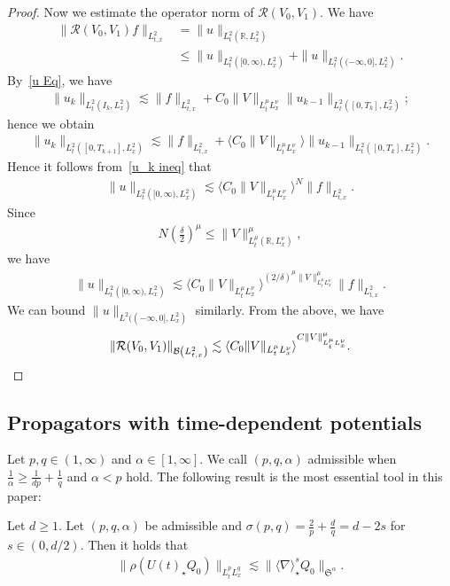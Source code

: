 \documentclass[AHL,Unicode,longabstracts,MathTools,published]{cedram}
\newcommand{\CB}{\mathcal{B}}
\newcommand{\CR}{\mathcal{R}}
\newcommand{\FS}{\mathfrak{S}}
\newcommand{\al}{\alpha}
\newcommand{\de}{\delta}
\newcommand{\si}{\sigma}
\newcommand{\rh}{\rho}
\newcommand{\K}[1]{\left(#1\right)}
\newcommand{\Br}[1]{\langle #1 \rangle}
\newcommand*\bra[1]{\langle#1\rangle}
\newcommand{\I}{\infty}
\newcommand{\sd}{\langle \nabla \rangle}
\newcommand{\st}{\star}
\newcommand{\R}{\mathbb{R}}
\newcommand{\ls}{\lesssim}
\begin{document}
\begin{proof}
Now we estimate the operator norm of $\CR(V_0, V_1)$. We have
\begin{align}
\|\CR(V_0,V_1)f\|_{L^2_{t,x}} &= \|u\|_{L^2_t\left(\R,L^2_x\right)} \\
&\leq \|u\|_{L^2_t\left([0,\I),L^2_x\right)} + \|u\|_{L^2_t\left((-\I,0],L^2_x\right)}.
\end{align}
By~\eqref{u Eq}, we have
\begin{align}\label{u_k ineq}
\|u_k\|_{L^2_t\left(I_k,L^2_x\right)}
\ls \|f\|_{L^2_{t,x}} + C_0\|V\|_{L^\mu_t L^\nu_x} \|u_{k-1}\|_{L^2_t\left([0,T_k],L^2_x\right)};
\end{align}
hence we obtain
\begin{align}
\|u_k\|_{L^2_t\left([0,T_{k+1}],L^2_x\right)}
\ls \|f\|_{L^2_{t,x}} + \Br{C_0\|V\|_{L^\mu_t L^\nu_x}}\|u_{k-1}\|_{L^2_t\left([0,T_k],L^2_x\right)}.
\end{align}
Hence it follows from~\eqref{u_k ineq} that
\begin{align}
\|u\|_{L^2_t\left([0,\I),L^2_x\right)} \ls \bra{C_0 \|V\|_{L^\mu_tL^\nu_x}}^N \|f\|_{L^2_{t,x}}.
\end{align}
Since
\begin{align}
N \K{\frac{\de}{2}}^\mu \leq \|V\|_{L^\mu_t\left(\R,L^\nu_x\right)}^\mu,
\end{align}
we have
\begin{align}
\|u\|_{L^2_t\left([0,\I),L^2_x\right)}
\lesssim \bra{C_0\|V\|_{L^\mu_tL^\nu_x}}^{(2/\de)^{\mu}\|V\|_{L^\mu_tL^\nu_x}^\mu} \|f\|_{L^2_{t,x}}.
\end{align}
We can bound $\|u\|_{L^2((-\I,0],L^2_x)}$ similarly. From the above, we have
\begin{equation}
\|\CR(V_0,V_1)\|_{\CB\left(L^2_{t,x}\right)}
\ls \bra{C_0\|V\|_{L^\mu_tL^\nu_x}}^{C\|V\|_{L^\mu_tL^\nu_x}^\mu}.\qedhere
\end{equation}
\end{proof}

\subsection{Propagators with time-dependent potentials} 

Let $p,q \in (1,\I)$ and $\al \in [1,\I]$. We call $(p,q,\al)$ admissible when $\frac{1}{\al} \ge \frac{1}{dp} + \frac{1}{q}$ and $\al < p$ hold. The following result is the most essential tool in this paper:

\begin{theo} \label{Ostri}
Let $d \ge 1$. Let $(p,q,\al)$ be admissible and $\si(p,q)=\frac{2}{p}+\frac{d}{q}=d-2s$ for $s \in (0,d/2)$. Then it holds that
\begin{align}
\|\rh(U(t)_\st Q_0)\|_{L^p_t L^q_x} \ls \|\sd^s_\st Q_0\|_{\FS^\al}.
\end{align}
\end{theo}
\end{document}
